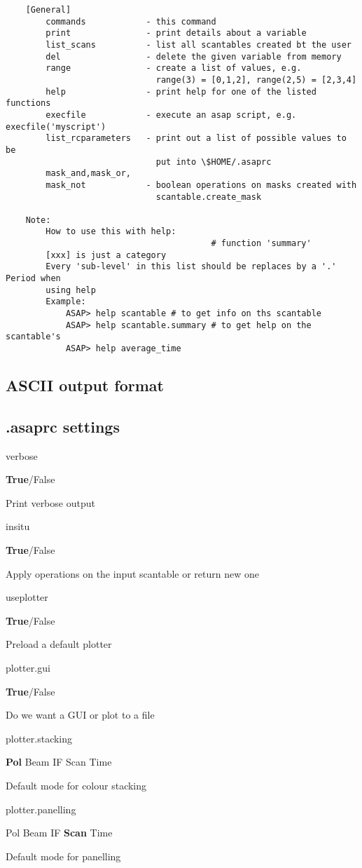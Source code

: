 \documentclass[11pt]{article}
\newcommand{\asaprc}[3]{
  \begin{minipage}[t]{45mm}#1\end{minipage}
  \begin{minipage}[t]{30mm}\raggedright #2\end{minipage}\hspace{3mm}
  \begin{minipage}[t]{\textwidth-75mm}#3\end{minipage}
}
\begin{document}
\begin{verbatim}
    [General]
        commands            - this command
        print               - print details about a variable
        list_scans          - list all scantables created bt the user
        del                 - delete the given variable from memory
        range               - create a list of values, e.g.
                              range(3) = [0,1,2], range(2,5) = [2,3,4]
        help                - print help for one of the listed functions
        execfile            - execute an asap script, e.g. execfile('myscript')
        list_rcparameters   - print out a list of possible values to be
                              put into \$HOME/.asaprc
        mask_and,mask_or,
        mask_not            - boolean operations on masks created with
                              scantable.create_mask

    Note:
        How to use this with help:
                                         # function 'summary'
        [xxx] is just a category
        Every 'sub-level' in this list should be replaces by a '.' Period when
        using help
        Example:
            ASAP> help scantable # to get info on ths scantable
            ASAP> help scantable.summary # to get help on the scantable's
            ASAP> help average_time

\end{verbatim}

\subsection{ASCII output format}

\subsection{.asaprc settings}
\asaprc{verbose}{{\bf True}/False}{Print verbose output}

\asaprc{insitu}{{\bf True}/False}{Apply operations on the input
scantable or return new one}


\asaprc{useplotter}{{\bf True}/False}{Preload a default plotter}

\asaprc{plotter.gui}{{\bf True}/False}{Do we want a GUI or plot to a
file}

\asaprc{plotter.stacking}{{\bf Pol} Beam IF Scan Time}{Default mode for
colour stacking}

\asaprc{plotter.panelling}{Pol Beam IF {\bf Scan} Time}{Default mode
for panelling}
\end{document}
